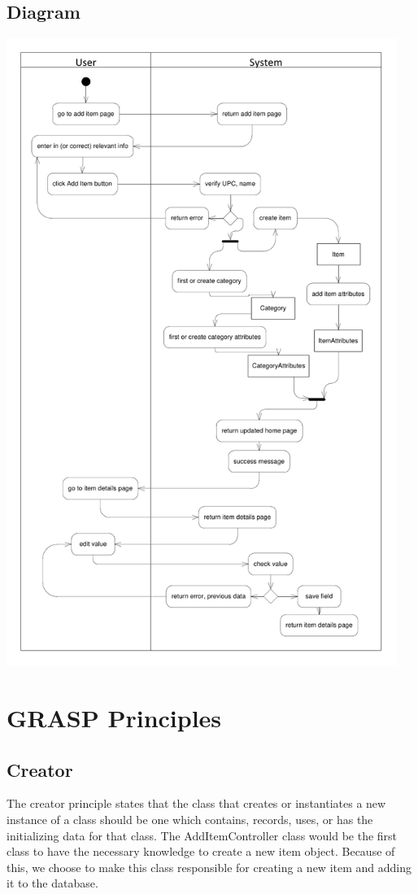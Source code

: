 \documentclass{article}
\begin{document}
\subsection{Diagram}
\includegraphics[keepaspectratio, width=5in]{activity_diagram.pdf}\\

\section{GRASP Principles}
\subsection{Creator}
The creator principle states that the class that creates or instantiates a new instance of a class should be one which contains, records, uses, or has the initializing data for that class. The AddItemController class would be the first class to have the necessary knowledge to create a new item object. Because of this, we choose to make this class responsible for creating a new item and adding it to the database.\\
\end{document}
